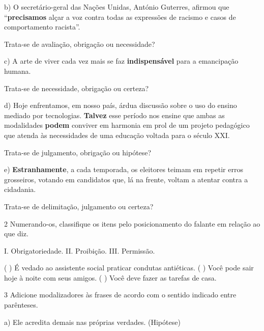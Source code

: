 b) O secretário-geral das Nações Unidas, António Guterres, afirmou que
``\textbf{precisamos} alçar a voz contra todas as expressões de racismo
e casos de comportamento racista''.

Trata-se de avaliação, obrigação ou necessidade?


c) A arte de viver cada vez mais se faz \textbf{indispensável} para a
emancipação humana.

Trata-se de necessidade, obrigação ou certeza?


d) Hoje enfrentamos, em nosso país, árdua discussão sobre o uso do
ensino mediado por tecnologias. \textbf{Talvez} esse período nos ensine
que ambas as modalidades \textbf{podem} conviver em harmonia em prol de
um projeto pedagógico que atenda às necessidades de uma educação voltada
para o século XXI.

Trata-se de julgamento, obrigação ou hipótese?


e) \textbf{Estranhamente}, a cada temporada, os eleitores teimam em
repetir erros grosseiros, votando em candidatos que, lá na frente,
voltam a atentar contra a cidadania.

Trata-se de delimitação, julgamento ou certeza?


\num{2} Numerando-os, classifique os itens pelo posicionamento do
falante em relação ao que diz.

\begin{multicols}{2}

I. Obrigatoriedade. 
II. Proibição. 
III. Permissão.

\columnbreak

(  ) É vedado ao assistente social praticar condutas
antiéticas. 
(  ) Você pode sair hoje à noite com seus
amigos. 
(  ) Você deve fazer as tarefas de casa.
\end{multicols}

\num{3} Adicione modalizadores às frases de acordo com o sentido
indicado entre parênteses.

a) Ele acredita demais nas próprias verdades. (Hipótese)


